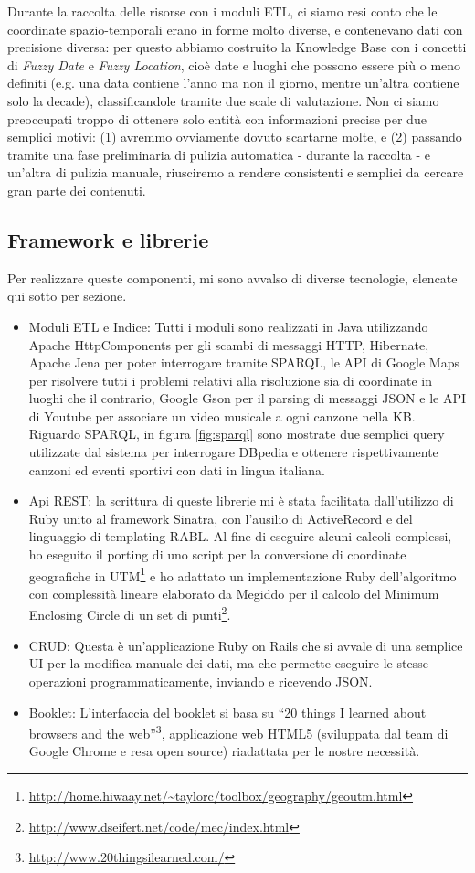 \documentclass[sigproc-sp.tex]{subfiles}
\begin{document}
Durante la raccolta delle risorse con i moduli ETL, ci siamo resi conto che le coordinate spazio-temporali erano in forme molto diverse, e contenevano dati con precisione diversa: per questo abbiamo costruito la Knowledge Base con i concetti di \textit{Fuzzy Date} e \textit{Fuzzy Location}, cioè date e luoghi che possono essere più o meno definiti (e.g. una data contiene l'anno ma non il giorno, mentre un'altra contiene solo la decade), classificandole tramite due scale di valutazione. Non ci siamo preoccupati troppo di ottenere solo entità con informazioni precise per due semplici motivi: (1) avremmo ovviamente dovuto scartarne molte, e (2) passando tramite una fase preliminaria di pulizia automatica - durante la raccolta - e un'altra di pulizia manuale, riusciremo a rendere consistenti e semplici da cercare gran parte dei contenuti.

\subsection{Framework e librerie}
Per realizzare queste componenti, mi sono avvalso di diverse tecnologie, elencate qui sotto per sezione.
\begin{itemize}
\item Moduli ETL e Indice: Tutti i moduli sono realizzati in Java utilizzando Apache HttpComponents per gli scambi di messaggi HTTP, Hibernate, Apache Jena per poter interrogare tramite SPARQL, le API di Google Maps per risolvere tutti i problemi relativi alla risoluzione sia di coordinate in luoghi che il contrario, Google Gson per il parsing di messaggi JSON e le API di Youtube per associare un video musicale a ogni canzone nella KB. Riguardo SPARQL, in figura \ref{fig:sparql} sono mostrate due semplici query utilizzate dal sistema per interrogare DBpedia e ottenere rispettivamente canzoni ed eventi sportivi con dati in lingua italiana.
\item Api REST: la scrittura di queste librerie mi è stata facilitata dall’utilizzo di Ruby unito al framework Sinatra, con l’ausilio di ActiveRecord e del linguaggio di templating RABL. Al fine di eseguire alcuni calcoli complessi, ho eseguito il porting di uno script per la conversione di coordinate geografiche in UTM\footnote{\url{http://home.hiwaay.net/~taylorc/toolbox/geography/geoutm.html}} e ho adattato un implementazione Ruby dell’algoritmo con complessità lineare elaborato da Megiddo per il calcolo del Minimum Enclosing Circle di un set di punti\footnote{\url{http://www.dseifert.net/code/mec/index.html}}.
\item CRUD: Questa è un’applicazione Ruby on Rails che si avvale di una semplice UI per la modifica manuale dei dati, ma che permette eseguire le stesse operazioni programmaticamente, inviando e ricevendo JSON.
\item Booklet: L’interfaccia del booklet si basa su “20 things I learned about browsers and the web”\footnote{\url{http://www.20thingsilearned.com/}}, applicazione web HTML5 (sviluppata dal team di Google Chrome e resa open source) riadattata per le nostre necessità.
\end{itemize}
\end{document}
